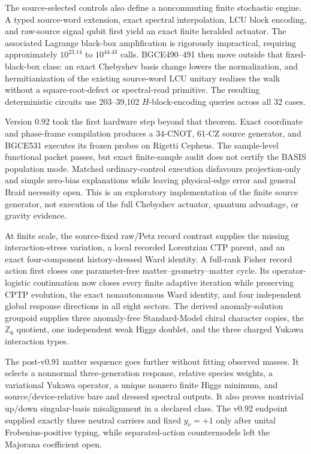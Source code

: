 \documentclass[11pt]{article}
\theoremstyle{definition}
\theoremstyle{remark}
\begin{document}
The source-selected controls also define a noncommuting finite stochastic engine. A typed source-word extension, exact spectral interpolation, LCU block encoding, and raw-source signal qubit first yield an exact finite heralded actuator. The associated Lagrange black-box amplification is rigorously impractical, requiring approximately $10^{23.14}$ to $10^{44.43}$ calls. BGCE490--491 then move outside that fixed-black-box class: an exact Chebyshev basis change lowers the normalization, and hermitianization of the existing source-word LCU unitary realizes the walk without a square-root-defect or spectral-read primitive. The resulting deterministic circuits use 203--39,102 $H$-block-encoding queries across all 32 cases.

Version 0.92 took the first hardware step beyond that theorem. Exact coordinate and phase-frame compilation produces a 34-CNOT, 61-CZ source generator, and BGCE531 executes its frozen probes on Rigetti Cepheus. The sample-level functional packet passes, but exact finite-sample audit does not certify the BASIS population mode. Matched ordinary-control execution disfavours projection-only and simple zero-bias explanations while leaving physical-edge error and general Braid necessity open. This is an exploratory implementation of the finite source generator, not execution of the full Chebyshev actuator, quantum advantage, or gravity evidence.

At finite scale, the source-fixed raw/Petz record contrast supplies the missing interaction-stress variation, a local recorded Lorentzian CTP parent, and an exact four-component history-dressed Ward identity. A full-rank Fisher record action first closes one parameter-free matter--geometry--matter cycle. Its operator-logistic continuation now closes every finite adaptive iteration while preserving CPTP evolution, the exact nonautonomous Ward identity, and four independent global response directions in all eight sectors. The derived anomaly-solution groupoid supplies three anomaly-free Standard-Model chiral character copies, the $\mathbb Z_6$ quotient, one independent weak Higgs doublet, and the three charged Yukawa interaction types.

The post-v0.91 matter sequence goes further without fitting observed masses. It selects a nonnormal three-generation response, relative species weights, a variational Yukawa operator, a unique nonzero finite Higgs minimum, and source/device-relative bare and dressed spectral outputs. It also proves nontrivial up/down singular-basis misalignment in a declared class. The v0.92 endpoint supplied exactly three neutral carriers and fixed $y_\nu=+1$ only after unital Frobenius-positive typing, while separated-action countermodels left the Majorana coefficient open.
\end{document}

